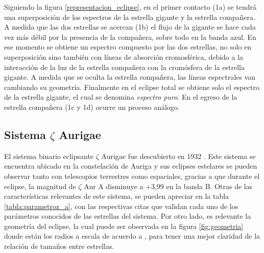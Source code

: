 \documentclass[12pt,oneside,openany,letter]{book}
\begin{document}
Siguiendo la figura \ref{representacion_eclipse}, en el primer contacto (1a) se tendrá una superposición de los espectros de la estrella gigante y la estrella compañera. A medida que las dos estrellas se acercan (1b) el flujo de la gigante se hace cada vez más débil por la presencia de la compañera, sobre todo en la banda azul. En ese momento se obtiene un espectro compuesto por las dos estrellas, no solo en superposición sino también con líneas de absorción cromosférica, debido a la interacción de la luz de la estrella compañera con la cromósfera de la estrella gigante. A medida que se oculta la estrella compañera, las líneas espectrales van cambiando su geometría. Finalmente en el eclipse total se obtiene solo el espectro de la estrella gigante, el cual se denomina \textit{espectro puro}. En el egreso de la estrella compañera (1c y 1d) ocurre un proceso análogo.

\subsection*{Sistema $\zeta$ Aurigae}\label{cap:zetaaur}

El sistema binario eclipsante $\zeta$ Aurigae fue descubierto en 1932 \citep{guthnick1934bevorstehende}. Este sistema se encuentra ubicado en la constelación de Auriga y sus eclipses estelares se pueden observar tanto con telescopios terrestres como espaciales, gracias a que durante el eclipse, la magnitud de $\zeta$ Aur A disminuye a +3,99 en la banda B. Otras de las características relevantes de este sistema, se pueden apreciar en la tabla \ref{tabla:parametroz_a}, con las respectivas citas que validan cada uno de los parámetros conocidos de las estrellas del sistema. Por otro lado, es relevante la geometría del eclipse, la cual puede ser observada en la figura \ref{fig:geometria} donde están los radios a escala de acuerdo a \citep{di1990angular}, para tener una mejor claridad de la relación de tamaños entre estrellas.

\end{document}
